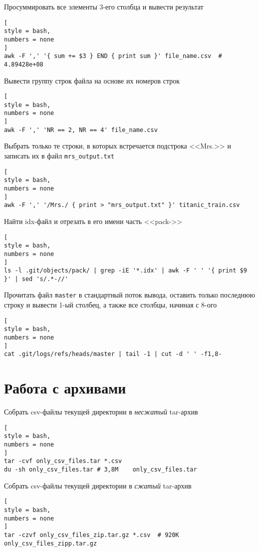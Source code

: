 \documentclass[%
	11pt,
	a4paper,
	utf8,
		]{article}
\begin{document}
Просуммировать все элементы 3-его столбца и вывести результат
\begin{lstlisting}[
style = bash,
numbers = none
]
awk -F ',' '{ sum += $3 } END { print sum }' file_name.csv  # 4.89428e+08
\end{lstlisting}

Вывести группу строк файла на основе их номеров строк
\begin{lstlisting}[
style = bash,
numbers = none
]
awk -F ',' 'NR == 2, NR == 4' file_name.csv
\end{lstlisting}

Выбрать только те строки, в которых встречается подстрока <<Mrs.>> и записать их в файл \verb|mrs_output.txt|
\begin{lstlisting}[
style = bash,
numbers = none
]
awk -F ',' '/Mrs./ { print > "mrs_output.txt" }' titanic_train.csv
\end{lstlisting}

Найти idx-файл и отрезать в его имени часть <<pack->>

\begin{lstlisting}[
style = bash,
numbers = none
]
ls -l .git/objects/pack/ | grep -iE '*.idx' | awk -F ' ' '{ print $9 }' | sed 's/.*-//'
\end{lstlisting}

Прочитать файл \texttt{master} в стандартный поток вывода, оставить только последнюю строку и вывести 1-ый столбец, а также все столбцы, начиная с 8-ого
\begin{lstlisting}[
style = bash,
numbers = none
]
cat .git/logs/refs/heads/master | tail -1 | cut -d ' ' -f1,8-
\end{lstlisting}


\section{Работа с архивами}

Собрать csv-файлы текущей директории в \emph{несжатый} tar-архив 
\begin{lstlisting}[
style = bash,
numbers = none	
]
tar -cvf only_csv_files.tar *.csv
du -sh only_csv_files.tar # 3,8M	only_csv_files.tar
\end{lstlisting}

Собрать csv-файлы текущей директории в \emph{сжатый} tar-архив 
\begin{lstlisting}[
style = bash,
numbers = none	
]
tar -czvf only_csv_files_zip.tar.gz *.csv  # 920K	only_csv_files_zipp.tar.gz
\end{lstlisting}
\end{document}

